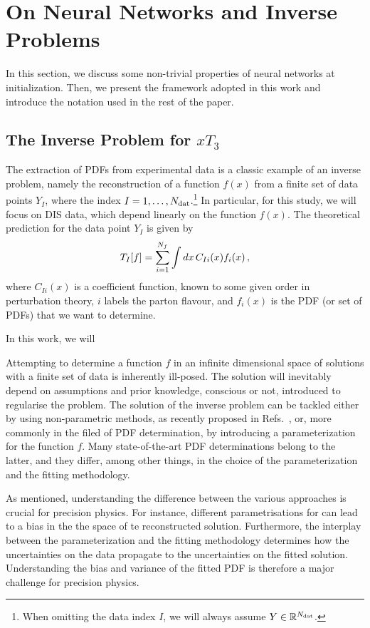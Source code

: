 \section{On Neural Networks and Inverse Problems}
\label{sec:Init}

In this section, we discuss some non-trivial properties of neural networks at
initialization. Then, we present the framework adopted in this work and
introduce the notation used in the rest of the paper.

\subsection{The Inverse Problem for $xT_3$}
\label{subsec:inverse_problem}

The extraction of PDFs from experimental data is a classic example of an inverse
problem, namely the reconstruction of a function $f(x)$ from a finite set of
data points $Y_I$, where the index $I=1, \ldots, N_{\mathrm{dat}}$.\footnote{When omitting
the data index $I$, we will always assume $Y \in \mathbb{R}^{N_{\mathrm{dat}}}$.} In
particular, for this study, we will focus on DIS data, which depend linearly on
the function $f(x)$. The theoretical prediction for the data point $Y_I$ is
given by
\begin{equation}
    \label{eq:TheoryPred}
    T_I[f] = \sum_{i=1}^{N_{f}} \int dx\, C_{Ii}(x) f_{i}(x)\, ,
\end{equation}
where $C_{Ii}(x)$ is a coefficient function, known to some given order in
perturbation theory, $i$ labels the parton flavour, and $f_i(x)$ is the PDF (or
set of PDFs) that we want to determine.

In this work, we will 

Attempting to determine a function $f$ in an infinite dimensional space of
solutions with a finite set of data is inherently ill-posed. The solution will
inevitably depend on assumptions and prior knowledge, conscious or not,
introduced to regularise the problem. The solution of the inverse problem
can be tackled either by using non-parametric methods, as recently proposed
in Refs.~\cite{DelDebbio:2021whr,Candido:2024hjt}, or, more commonly in the
filed of PDF determination, by introducing a parameterization for the function
$f$. Many state-of-the-art PDF determinations belong to the latter, and
they differ, among other things, in the choice of the parameterization and the
fitting methodology.

As mentioned, understanding the difference between the various approaches is
crucial for precision physics. For instance, different parametrisations for
can lead to a bias in the the space of te reconstructed solution. Furthermore,
the interplay between the parameterization and the fitting methodology determines
how the uncertainties on the data propagate to the uncertainties on the fitted
solution. Understanding the bias and variance of the fitted PDF is therefore a
major challenge for precision physics.

